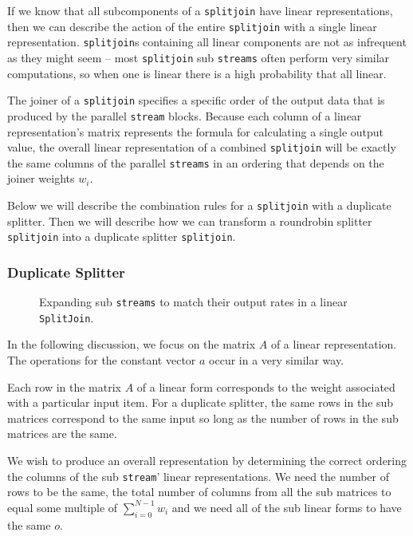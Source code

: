 If we know that all subcomponents of a {\tt splitjoin} 
have linear representations, then we can describe the action of the entire {\tt splitjoin} 
with a single linear representation.
{\tt splitjoin}s containing all linear components are not as infrequent as they might seem -- 
most {\tt splitjoin} sub {\tt streams} often perform very similar computations, so when one 
is linear there is a high probability that all linear.

The joiner of a {\tt splitjoin} specifies a specific order of the output data 
that is produced by the parallel {\tt stream} blocks. Because each column 
of a linear representation's matrix represents the formula for calculating a single output value, 
the overall linear representation of a combined {\tt splitjoin} will be exactly 
the same columns of the parallel {\tt streams} in an ordering that depends on the joiner weights $w_i$.

Below we will describe the combination rules for a {\tt splitjoin}
with a duplicate splitter. Then we will describe how we can transform 
a roundrobin splitter {\tt splitjoin} into a duplicate splitter {\tt splitjoin}. 


\subsubsection{Duplicate Splitter}

\begin{figure}
\center
\epsfxsize=3.0in
\caption{Expanding sub {\tt streams} to match their output rates in a linear {\tt SplitJoin}.}
\label{fig:splitjoin-duplicate-ratematch}
\end{figure}

In the following discussion, we focus on the matrix $A$ of a linear representation.
The operations for the constant vector $a$ occur in a very similar way.

Each row in the matrix $A$ of a linear form corresponds to the
weight associated with a particular input item. For a duplicate splitter,
the same rows in the sub matrices correspond to the same
input so long as the number of rows in the sub matrices are the same.

We wish to produce an overall representation by determining the correct
ordering the columns of the sub {\tt stream}' linear representations. We
need the number of rows to be the same, the total number of columns 
from all the sub matrices to equal some multiple of $\sum_{i=0}^{N-1}w_i$
and we need all of the sub linear forms to have the same $o$. 

